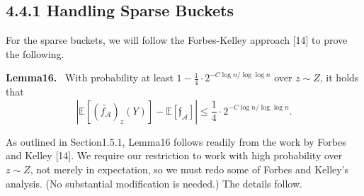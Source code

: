 \documentclass[10pt,a4paper]{article}
\newenvironment{authorclaim}[1]{\par\medskip\noindent\textbf{#1.}\ \ignorespaces}{\par\medskip}
\begin{document}
\subsection*{4.4.1 Handling Sparse Buckets}
For the sparse buckets, we will follow the Forbes-Kelley approach [14] to prove the following.
\begin{authorclaim}{Lemma16}
With probability at least $1-\frac14\cdot2^{-C\log n/\log\log n}$ over $z\sim Z$, it holds that
\[
|\mathbb E[(\widetilde{f_{\mathcal A}})_z(Y)]-\mathbb E[\mathfrak f_{\mathcal A}]|
\le\frac14\cdot2^{-C\log n/\log\log n}.
\]
\end{authorclaim}
As outlined in Section1.5.1, Lemma16 follows readily from the work by Forbes and Kelley [14]. We require our restriction to work with high probability over $z\sim Z$, not merely in expectation, so we must redo some of Forbes and Kelley's analysis. (No substantial modification is needed.) The details follow.
\end{document}
